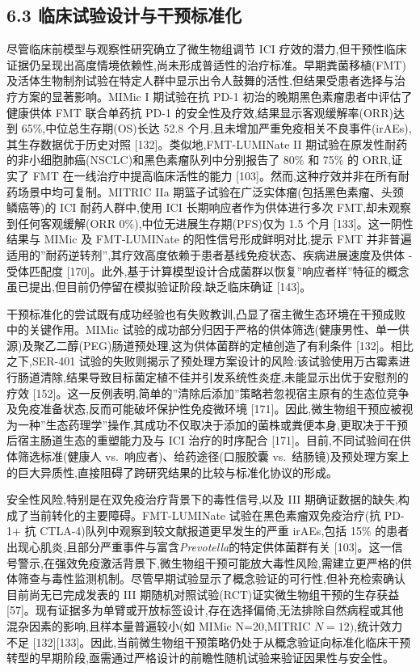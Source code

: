 \documentclass[11pt]{article}
\begin{document}
\subsection{6.3 临床试验设计与干预标准化}\label{ux4e34ux5e8aux8bd5ux9a8cux8bbeux8ba1ux4e0eux5e72ux9884ux6807ux51c6ux5316}

尽管临床前模型与观察性研究确立了微生物组调节 ICI 疗效的潜力,但干预性临床证据仍呈现出高度情境依赖性,尚未形成普适性的治疗标准。早期粪菌移植(FMT)及活体生物制剂试验在特定人群中显示出令人鼓舞的活性,但结果受患者选择与治疗方案的显著影响。MIMic I 期试验在抗 PD-1 初治的晚期黑色素瘤患者中评估了健康供体 FMT 联合单药抗 PD-1 的安全性及疗效,结果显示客观缓解率(ORR)达到 65\%,中位总生存期(OS)长达 52.8 个月,且未增加严重免疫相关不良事件(irAEs),其生存数据优于历史对照 {[}132{]}。类似地,FMT-LUMINate II 期试验在原发性耐药的非小细胞肺癌(NSCLC)和黑色素瘤队列中分别报告了 80\% 和 75\% 的 ORR,证实了 FMT 在一线治疗中提高临床活性的能力 {[}103{]}。然而,这种疗效并非在所有耐药场景中均可复制。MITRIC IIa 期篮子试验在广泛实体瘤(包括黑色素瘤、头颈鳞癌等)的 ICI 耐药人群中,使用 ICI 长期响应者作为供体进行多次 FMT,却未观察到任何客观缓解(ORR 0\%),中位无进展生存期(PFS)仅为 1.5 个月 {[}133{]}。这一阴性结果与 MIMic 及 FMT-LUMINate 的阳性信号形成鲜明对比,提示 FMT 并非普遍适用的''耐药逆转剂'',其疗效高度依赖于患者基线免疫状态、疾病进展速度及供体 - 受体匹配度 {[}170{]}。此外,基于计算模型设计合成菌群以恢复''响应者样''特征的概念虽已提出,但目前仍停留在模拟验证阶段,缺乏临床确证 {[}143{]}。

干预标准化的尝试既有成功经验也有失败教训,凸显了宿主微生态环境在干预成败中的关键作用。MIMic 试验的成功部分归因于严格的供体筛选(健康男性、单一供源)及聚乙二醇(PEG)肠道预处理,这为供体菌群的定植创造了有利条件 {[}132{]}。相比之下,SER-401 试验的失败则揭示了预处理方案设计的风险:该试验使用万古霉素进行肠道清除,结果导致目标菌定植不佳并引发系统性炎症,未能显示出优于安慰剂的疗效 {[}152{]}。这一反例表明,简单的''清除后添加''策略若忽视宿主原有的生态位竞争及免疫准备状态,反而可能破坏保护性免疫微环境 {[}171{]}。因此,微生物组干预应被视为一种''生态药理学''操作,其成功不仅取决于添加的菌株或粪便本身,更取决于干预后宿主肠道生态的重塑能力及与 ICI 治疗的时序配合 {[}171{]}。目前,不同试验间在供体筛选标准(健康人 vs.~响应者)、给药途径(口服胶囊 vs.~结肠镜)及预处理方案上的巨大异质性,直接阻碍了跨研究结果的比较与标准化协议的形成。

安全性风险,特别是在双免疫治疗背景下的毒性信号,以及 III 期确证数据的缺失,构成了当前转化的主要障碍。FMT-LUMINate 试验在黑色素瘤双免疫治疗(抗 PD-1+ 抗 CTLA-4)队列中观察到较文献报道更早发生的严重 irAEs,包括 15\% 的患者出现心肌炎,且部分严重事件与富含\emph{Prevotella}的特定供体菌群有关 {[}103{]}。这一信号警示,在强效免疫激活背景下,微生物组干预可能放大毒性风险,需建立更严格的供体筛查与毒性监测机制。尽管早期试验显示了概念验证的可行性,但补充检索确认目前尚无已完成发表的 III 期随机对照试验(RCT)证实微生物组干预的生存获益 {[}57{]}。现有证据多为单臂或开放标签设计,存在选择偏倚,无法排除自然病程或其他混杂因素的影响,且样本量普遍较小(如 MIMic N=20,MITRIC \(N=12)\),统计效力不足 {[}132{]}{[}133{]}。因此,当前微生物组干预策略仍处于从概念验证向标准化临床干预转型的早期阶段,亟需通过严格设计的前瞻性随机试验来验证因果性与安全性。
\end{document}
